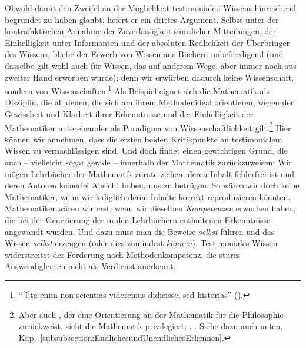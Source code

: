 \begin{nummerierung}
 \item{}\label{Abschnitt:DescartesundhistorischeKenntnisse} Obwohl
  damit den Zweifel an der Möglichkeit testimonialen Wissens
 hinreichend begründet zu haben glaubt, liefert er ein drittes Argument.
 Selbst unter der kontrafaktischen Annahme der Zuverlässigkeit sämtlicher
 Mitteilungen, der Einhelligkeit unter Informanten und der absoluten Redlichkeit
 der Überbringer des Wissens, bliebe der Erwerb von Wissen aus Büchern
 unbefriedigend (und dasselbe gilt wohl auch für Wissen, das auf anderem Wege,
 aber immer noch aus zweiter Hand erworben wurde); denn wir erwürben dadurch
 keine Wissenschaft, sondern  von
 Wissenschaften.\footnote{\enquote{[I]ta enim non scientias videremus didicisse,
 sed historias} \mkbibparens{\cite[][X:
 367.22--23]{Descartes:OeuvresdeDescartes1983}}.} Als Beispiel eignet sich die
 Mathematik als Disziplin, die all denen, die sich am ihrem
 Methodenideal orientieren, wegen der Gewissheit und Klarheit ihrer
 Erkenntnisse und der Einhelligkeit der Mathematiker untereinander als Paradigma
 von Wissenschaftlichkeit gilt.\footnote{Aber auch , der
 eine Orientierung an der Mathematik für die Philosophie zurückweist, sieht die
 Mathematik privilegiert; \cite[vgl.][B~x]{Kant:KritikderreinenVernunft2003},
 \cite[][III:  9.7--9]{Kant:GesammelteWerke1900ff.}. Siehe dazu auch
 unten, Kap.~\ref{subsubsection:EndlichesundUnendlichesErkennen}.} Hier können wir annehmen, dass die
 ersten beiden Kritikpunkte an testimonialem Wissen zu vernachlässigen sind. Und doch
 findet  einen gewichtigen Grund, die
  auch -- vielleicht sogar gerade -- innerhalb der Mathematik
 zurückzuweisen: Wir mögen Lehrbücher der Mathematik zurate ziehen, deren Inhalt
 fehlerfrei ist und deren Autoren keinerlei Absicht haben, uns zu betrügen. So
 wären wir doch keine Mathematiker, wenn wir lediglich
 deren Inhalte korrekt reproduzieren könnten. Mathematiker wären wir erst, wenn
 wir dieselben \emph{Kompetenzen} erworben haben, die bei der Generierung der in den
 Lehrbüchern enthaltenen Erkenntnisse angewandt wurden. Und dazu muss man die
 Beweise \emph{selbst} führen und das Wissen \emph{selbst} erzeugen
 (oder dies zumindest \emph{können}). Testimoniales Wissen widerstreitet der
 Forderung nach Methodenkompetenz, die stures Auswendiglernen nicht als
 Verdienst anerkennt.
 

\end{nummerierung}
